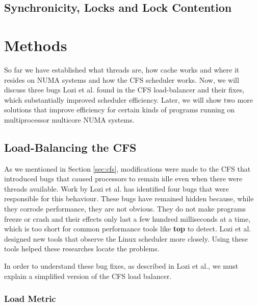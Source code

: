 \documentclass{sig-alternate}
\begin{document}

\subsection{Synchronicity, Locks and Lock Contention}
\label{sec:locks}





\section{Methods}
\label{sec:methods}

So far we have established what threads are, how cache works and where it resides on NUMA systems and how the CFS scheduler works. Now, we will discuss three bugs Lozi et al. found in the CFS load-balancer and their fixes, which substantially improved scheduler efficiency. Later, we will show two more solutions that improve efficiency for certain kinds of programs running on multiprocessor multicore NUMA systems.

\subsection{Load-Balancing the CFS}
\label{sec:loadbalance}

As we mentioned in Section \ref{sec:cfs}, modifications were made to the CFS that introduced bugs that caused processors to remain idle even when there were threads available. Work by Lozi et al. has identified four bugs that were responsible for this behaviour. These bugs have remained hidden because, while they corrode performance, they are not obvious. They do not make programs freeze or crash and their effects only last a few hundred milliseconds at a time, which is too short for common performance tools like \textbf{top} to detect. Lozi et al. designed new tools that observe the Linux scheduler more closely. Using these tools helped these researches locate the problems.~\cite{Lozi:2016}

In order to understand these bug fixes, as described in Lozi et al., we must explain a simplified version of the CFS load balancer.~\cite{Lozi:2016}

\subsubsection{Load Metric}
\label{sec:loadmetric}
\end{document}
